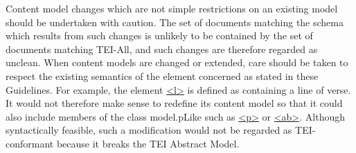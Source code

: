 Content model changes which are not simple restrictions on an existing model should be undertaken with caution. The set of documents matching the schema which results from such changes is unlikely to be contained by the set of documents matching TEI-All, and such changes are therefore regarded as unclean. When content models are changed or extended, care should be taken to respect the existing semantics of the element concerned as stated in these Guidelines. For example, the element \hyperref[TEI.l]{<l>} is defined as containing a line of verse. It would not therefore make sense to redefine its content model so that it could also include members of the class \textsf{model.pLike} such as \hyperref[TEI.p]{<p>} or \hyperref[TEI.ab]{<ab>}. Although syntactically feasible, such a modification would not be regarded as TEI-conformant because it breaks the TEI Abstract Model.
